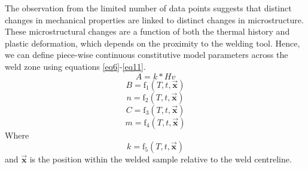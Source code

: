 	The observation from the limited number of data points suggests that distinct changes in mechanical properties are linked to distinct changes in microstructure. These microstructural changes are a function of both the thermal history and plastic deformation, which depends on the proximity to the welding tool. Hence, we can define piece-wise continuous constitutive model parameters across the weld zone using equations \ref{eq6}-\ref{eq11}.  
	\begin{equation}
	\label{eq6}
	A=k*Hv 
	\end{equation}
	\begin{equation}
	\label{eq7}
	B=\text{f}_1(T,t,\vec{\textbf{x}})
	\end{equation}
	\begin{equation}
	\label{eq8}
	n=\text{f}_2(T,t,\vec{\textbf{x}})
	\end{equation}
	\begin{equation}
	\label{eq9}
	C=\text{f}_3(T,t,\vec{\textbf{x}})
	\end{equation}
	\begin{equation}
	\label{eq10}
	m=\text{f}_4(T,t,\vec{\textbf{x}})
	\end{equation}
	Where
	\begin{equation}
	\label{eq11}
	k=\text{f}_5(T,t,\vec{\textbf{x}})
	\end{equation}
	and $\vec{\textbf{x}}$ is the position within the welded sample relative to the weld centreline.
	
